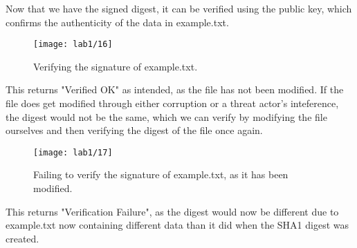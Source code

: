 
Now that we have the signed digest, it can be verified using the public key, which confirms the authenticity
of the data in example.txt.

\begin{figure}[H]
    \centering
    \texttt{[image: lab1/16]}
    \caption{Verifying the signature of example.txt.}
    \label{fig:signatureVerify}
\end{figure}

This returns "Verified OK" as intended, as the file has not been modified.
If the file does get modified through either corruption or a threat actor's inteference,
the digest would not be the same, which we can verify by modifying the file ourselves
and then verifying the digest of the file once again.

\begin{figure}[H]
    \centering
    \texttt{[image: lab1/17]}
    \caption{Failing to verify the signature of example.txt, as it has been modified.}
    \label{fig:signatureVerifyFail}
\end{figure}

This returns "Verification Failure", as the digest would now be different due to example.txt now containing
different data than it did when the SHA1 digest was created.





